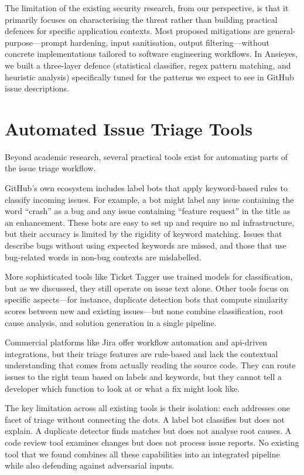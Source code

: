 The limitation of the existing security research, from our perspective, is that it primarily focuses on characterising the threat rather than building practical defences for specific application contexts. Most proposed mitigations are general-purpose---prompt hardening, input sanitisation, output filtering---without concrete implementations tailored to software engineering workflows. In Ansieyes, we built a three-layer defence (statistical classifier, regex pattern matching, and heuristic analysis) specifically tuned for the patterns we expect to see in GitHub issue descriptions.

\section{\textbf{Automated Issue Triage Tools}}

Beyond academic research, several practical tools exist for automating parts of the issue triage workflow.

GitHub's own ecosystem includes label bots that apply keyword-based rules to classify incoming issues. For example, a bot might label any issue containing the word ``crash'' as a bug and any issue containing ``feature request'' in the title as an enhancement. These bots are easy to set up and require no \gls{ml} infrastructure, but their accuracy is limited by the rigidity of keyword matching. Issues that describe bugs without using expected keywords are missed, and those that use bug-related words in non-bug contexts are mislabelled.

More sophisticated tools like Ticket Tagger \cite{Kallis2019} use trained models for classification, but as we discussed, they still operate on issue text alone. Other tools focus on specific aspects---for instance, duplicate detection bots that compute similarity scores between new and existing issues---but none combine classification, root cause analysis, and solution generation in a single pipeline.

Commercial platforms like Jira offer workflow automation and \gls{api}-driven integrations, but their triage features are rule-based and lack the contextual understanding that comes from actually reading the source code. They can route issues to the right team based on labels and keywords, but they cannot tell a developer which function to look at or what a fix might look like.

The key limitation across all existing tools is their isolation: each addresses one facet of triage without connecting the dots. A label bot classifies but does not explain. A duplicate detector finds matches but does not analyse root causes. A code review tool examines changes but does not process issue reports. No existing tool that we found combines all these capabilities into an integrated pipeline while also defending against adversarial inputs.

